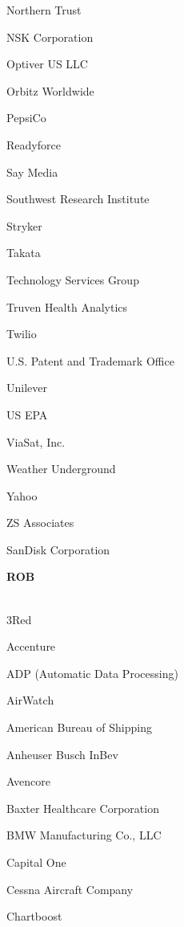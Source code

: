 \documentclass[twoside]{article}
\begin{document}
\begin{center}
\begin{multicols}{5}
\begin{FlushLeft}
\begin{compactitem}
\item Northern Trust
\item NSK Corporation
\item Optiver US LLC
\item Orbitz Worldwide
\item PepsiCo
\item Readyforce
\item Say Media
\item Southwest Research Institute
\item Stryker
\item Takata
\item Technology Services Group
\item Truven Health Analytics
\item Twilio
\item U.S. Patent and Trademark Office
\item Unilever
\item US EPA
\item ViaSat, Inc.
\item Weather Underground
\item Yahoo
\item ZS Associates
\item SanDisk Corporation
\end{compactitem}
        \end{FlushLeft}
        \vspace{1em}
        {\fontsize{14}{16}\selectfont \bf ROB}\\
        \vspace{-1em}
        ~\hrulefill~
        \vspace{-.9em}
        \begin{FlushLeft}
        \begin{compactitem}
        \item 3Red
\item Accenture
\item ADP (Automatic Data Processing)
\item AirWatch
\item American Bureau of Shipping
\item Anheuser Busch InBev
\item Avencore
\item Baxter Healthcare Corporation
\item BMW Manufacturing Co., LLC
\item Capital One
\item Cessna Aircraft Company
\item Chartboost

\end{compactitem}
\end{FlushLeft}
\end{multicols}
\end{center}
\end{document}
